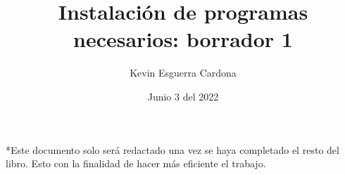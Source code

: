 \documentclass[12pt, letterpaper]{article}
\title{Instalación de programas necesarios: borrador 1}
\author{Kevin Esguerra Cardona}
\date{Junio 3 del 2022}
\begin{document}
\maketitle

*Este documento solo será redactado una vez se haya completado el resto del libro. Esto con la finalidad de hacer más eficiente el trabajo.
\end{document}
